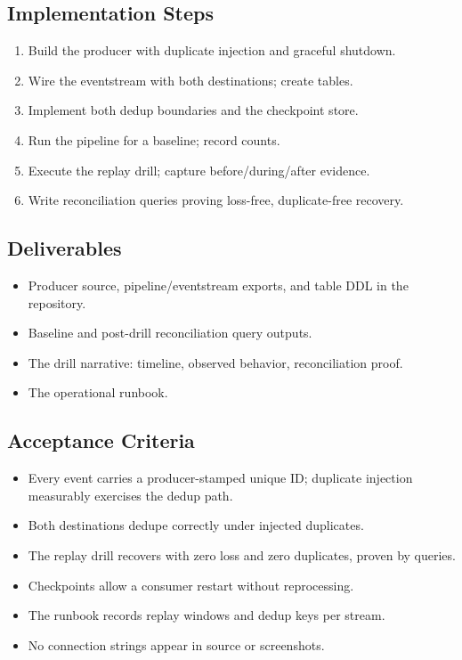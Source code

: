 \subsection*{Implementation Steps}
\begin{enumerate}
    \item Build the producer with duplicate injection and graceful shutdown.
    \item Wire the eventstream with both destinations; create tables.
    \item Implement both dedup boundaries and the checkpoint store.
    \item Run the pipeline for a baseline; record counts.
    \item Execute the replay drill; capture before/during/after evidence.
    \item Write reconciliation queries proving loss-free, duplicate-free recovery.
\end{enumerate}

\subsection*{Deliverables}
\begin{itemize}
    \item Producer source, pipeline/eventstream exports, and table DDL in the repository.
    \item Baseline and post-drill reconciliation query outputs.
    \item The drill narrative: timeline, observed behavior, reconciliation proof.
    \item The operational runbook.
\end{itemize}

\subsection*{Acceptance Criteria}
\begin{itemize}
    \item[\(\square\)] Every event carries a producer-stamped unique ID; duplicate injection measurably exercises the dedup path.
    \item[\(\square\)] Both destinations dedupe correctly under injected duplicates.
    \item[\(\square\)] The replay drill recovers with zero loss and zero duplicates, proven by queries.
    \item[\(\square\)] Checkpoints allow a consumer restart without reprocessing.
    \item[\(\square\)] The runbook records replay windows and dedup keys per stream.
    \item[\(\square\)] No connection strings appear in source or screenshots.
\end{itemize}

